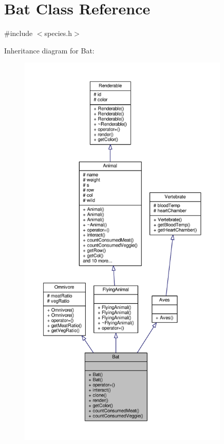 \hypertarget{classBat}{}\section{Bat Class Reference}
\label{classBat}


{\ttfamily \#include $<$species.\+h$>$}



Inheritance diagram for Bat\+:
\nopagebreak
\begin{figure}[H]
\begin{center}
\leavevmode
\includegraphics[height=550pt]{classBat__inherit__graph}
\end{center}
\end{figure}


